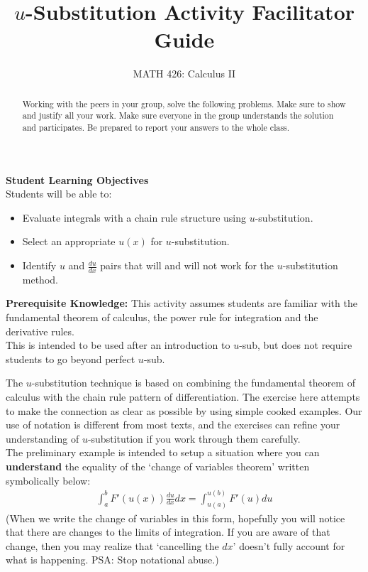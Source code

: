 \documentclass{ximera}
\title{$u$-Substitution Activity Facilitator Guide}
\author{MATH 426: Calculus II}
\begin{document}
\begin{abstract}
   Working with the peers in your group, solve the following problems. Make sure to show and justify all your work. Make sure everyone in the group understands the solution and participates. Be prepared to report your answers to the whole class. 
\end{abstract}
\maketitle

\textbf{Student Learning Objectives}\\
Students will be able to:
    \begin{itemize}
        \item Evaluate integrals with a chain rule structure using $u$-substitution.
        \item Select an appropriate $u(x)$ for $u$-substitution.
        \item Identify $u$ and $\frac{du}{dx}$ pairs that will and will not work for the $u$-substitution method.
    \end{itemize}

\textbf{Prerequisite Knowledge:} This activity assumes students are familiar with the fundamental theorem of calculus, the power rule for integration and the derivative rules.\\
This is intended to be used after an introduction to $u$-sub, but does not require students to go beyond perfect $u$-sub.

The $u$-substitution technique is based on combining the fundamental theorem of calculus with the chain rule pattern of differentiation. The exercise here attempts to make the connection as clear as possible by using simple cooked examples. Our use of notation is different from most texts, and the exercises can refine your understanding of $u$-substitution if you work through them carefully.\\

The preliminary example is intended to setup a situation where you can {\bf{understand}} the equality of the `change of variables theorem' written symbolically below:
\begin{align}
	\int_{a}^b F'(u(x))\frac{du}{dx} dx = \int_{u(a)}^{u(b)} F'(u)du \nonumber
\end{align}
(When we write the change of variables in this form, hopefully you will notice that there are changes to the limits of integration. If you are aware of that change, then you may realize that `cancelling the $dx$' doesn't fully account for what is happening. PSA: Stop notational abuse.)
\end{document}
